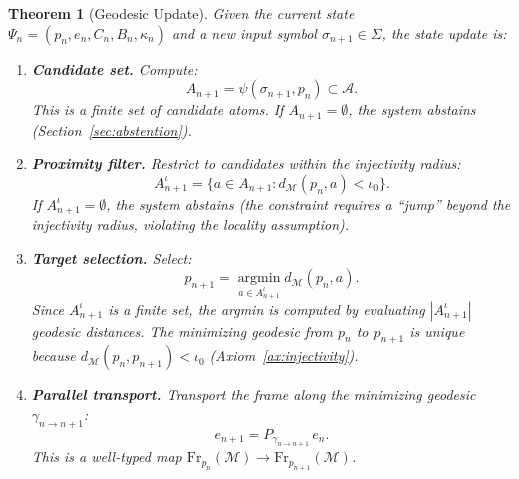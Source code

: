 \documentclass[11pt,a4paper]{article}
\newtheorem{theorem}{Theorem}[section]
\theoremstyle{definition}
\theoremstyle{remark}
\newcommand{\Fr}{\mathrm{Fr}}
\begin{document}
\begin{theorem}[Geodesic Update]\label{thm:update}
Given the current state 
$\Psi_n = (p_n, e_n, C_n, B_n, \kappa_n)$ and a new input symbol 
$\sigma_{n+1} \in \Sigma$, the state update is:
\begin{enumerate}[label=(\roman*),nosep]
    \item \textbf{Candidate set.} Compute:
    \begin{equation}\label{eq:candidates}
        A_{n+1} = \psi(\sigma_{n+1}, p_n) \subset \mathcal{A}.
    \end{equation}
    This is a finite set of candidate atoms. If 
    $A_{n+1} = \emptyset$, the system abstains 
    (Section~\ref{sec:abstention}).
    
    \item \textbf{Proximity filter.} Restrict to candidates within 
    the injectivity radius:
    \begin{equation}\label{eq:proximity}
        A_{n+1}^{\iota} = \{a \in A_{n+1} : 
        d_{\mathcal{M}}(p_n, a) < \iota_0\}.
    \end{equation}
    If $A_{n+1}^{\iota} = \emptyset$, the system abstains 
    (the constraint requires a ``jump'' beyond the injectivity 
    radius, violating the locality assumption).
    
    \item \textbf{Target selection.} Select:
    \begin{equation}\label{eq:target}
        p_{n+1} = \operatorname*{argmin}_{a \in A_{n+1}^{\iota}} 
        d_{\mathcal{M}}(p_n, a).
    \end{equation}
    Since $A_{n+1}^{\iota}$ is a finite set, the argmin is 
    computed by evaluating $|A_{n+1}^{\iota}|$ geodesic distances. 
    The minimizing geodesic from $p_n$ to $p_{n+1}$ is unique 
    because $d_{\mathcal{M}}(p_n, p_{n+1}) < \iota_0$ 
    (Axiom~\ref{ax:injectivity}).
    
    \item \textbf{Parallel transport.} Transport the frame along 
    the minimizing geodesic $\gamma_{n \to n+1}$:
    \begin{equation}\label{eq:transport}
        e_{n+1} = P_{\gamma_{n \to n+1}}\, e_n.
    \end{equation}
    This is a well-typed map 
    $\Fr_{p_n}(\mathcal{M}) \to \Fr_{p_{n+1}}(\mathcal{M})$.
    

\end{enumerate}
\end{theorem}
\end{document}

